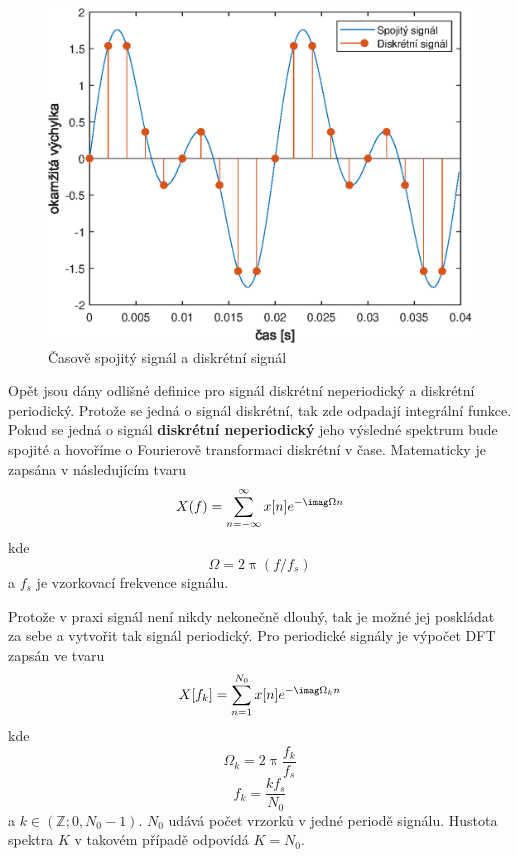   \begin{figure}[H]
    \centering
    \includegraphics[width = 0.8\linewidth]{obrazky/Discrete_signal.eps}
    \caption{Časově spojitý signál a diskrétní signál}
    \label{fig:Discrete_signal}
  \end{figure}

  Opět jsou dány odlišné definice pro signál diskrétní neperiodický a diskrétní periodický. Protože se jedná o signál diskrétní, tak zde odpadají integrální funkce.
  Pokud se jedná o signál \textbf{diskrétní neperiodický} jeho výsledné spektrum bude spojité a hovoříme o Fourierově transformaci diskrétní v čase. Matematicky je zapsána v následujícím tvaru
  \begin{equation}
    X(f) = \sum_{n = -\infty}^{\infty} x[n] e^{-\imag \Omega n}
    \label{rov:DTFT}
  \end{equation}
  kde
  \begin{equation}
    \Omega = 2 \uppi (f/f_s)
  \end{equation}
  a $f_s$ je vzorkovací frekvence signálu.

  Protože v praxi signál není nikdy nekonečně dlouhý, tak je možné jej poskládat za sebe a vytvořit tak signál periodický. Pro periodické signály je výpočet \acs{DFT} zapsán ve tvaru
  \begin{equation}
    X[f_k] = \sum_{n = 1}^{N_0} x[n] e^{-\imag\Omega_k n}
    \label{rov:DFT}
  \end{equation}
  kde
  \begin{equation}
    \Omega_k = 2 \uppi \frac{f_k}{f_s}
  \end{equation}
  \begin{equation}
    f_k = \frac{k f_s}{N_0}
  \end{equation}
  a $k \in(\mathbb{Z}; 0, N_0 -1)$. $N_0$ udává počet vrzorků v jedné periodě signálu.
  Hustota spektra $K$ v takovém případě odpovídá $K = N_0$.

